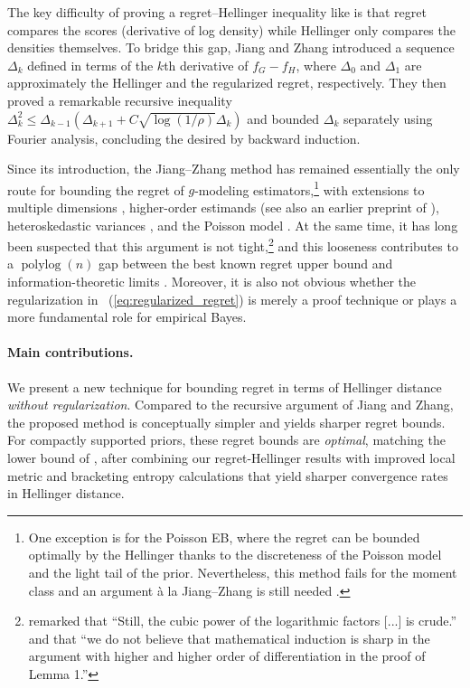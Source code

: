 \documentclass[letterpaper,11pt]{article}
\newcommand{\eqref}[1]{~(\ref{#1})}
\theoremstyle{definition}
\newcommand{\polylog}{\operatorname{polylog}}
\begin{document}
The key difficulty of proving a regret--Hellinger inequality like  is
that regret compares the scores (derivative of log density) while Hellinger only compares
the densities themselves. To bridge this gap, Jiang and Zhang introduced a sequence $\Delta_k$ defined in terms of the $k$th derivative of $f_G-f_H$, where  $\Delta_0$ and $\Delta_1$ are approximately the Hellinger and the regularized regret, respectively. 
They then proved a remarkable recursive inequality 
$\Delta_k^2 \leq \Delta_{k-1}(\Delta_{k+1} + C \sqrt{\log(1/\rho)}  \Delta_k)$ and bounded  $\Delta_k$ separately using Fourier analysis, concluding the desired  by backward induction.

Since its introduction, the Jiang--Zhang method has remained essentially the only route for
bounding the regret of $g$-modeling estimators,\footnote{One exception is \cite{JPW21} for
the Poisson EB, where the regret can be bounded optimally by the Hellinger thanks to the
discreteness of the Poisson model and the light tail of the prior. Nevertheless, this
method fails for the moment class and an argument \`a la  Jiang--Zhang is still needed 
\cite{SW22}.} %
with extensions to multiple dimensions \cite{saha2020nonparametric}, higher-order estimands
\cite{ghosh2025stein} (see also an earlier preprint of \cite{chen2026empirical}),
heteroskedastic variances \cite{jiang2020general,soloff2025multivariate,chen2026empirical}, and the Poisson model 
\cite{SW22}.
At the same time, it has long been suspected that this argument is not
tight,\footnote{\cite{JiangZhang2009} remarked that ``Still, the cubic power of the
logarithmic factors [...]
is crude.'' and that
``we do not believe that mathematical
induction is sharp in the argument with higher and higher order of differentiation
in the proof of Lemma 1.''
} and this looseness contributes to a $\polylog(n)$
gap between the best known regret upper bound and information-theoretic limits
\cite{polyanskiy2021sharp,kang2026function}. Moreover, it is also not obvious whether the
regularization in \eqref{eq:regularized_regret} is merely a proof technique or plays a 
more fundamental role for empirical Bayes.

\paragraph{Main contributions.}
We present a new technique for bounding regret in terms of Hellinger distance
\textit{without regularization}. Compared to the recursive argument of Jiang and Zhang,
the proposed method is conceptually simpler and yields sharper regret bounds. For
compactly supported priors, these regret bounds are \emph{optimal}, matching the lower
bound of \cite{polyanskiy2021sharp}, after combining our regret-Hellinger results with improved
local metric and bracketing entropy calculations that yield sharper convergence rates in
Hellinger distance.
\end{document}
